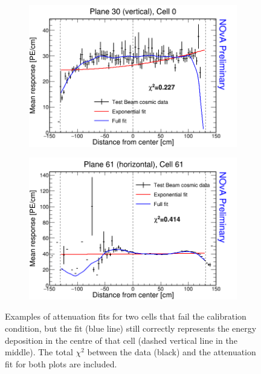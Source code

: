 \begin{figure}[h]
\centering
\begin{subfigure}[b]{0.495\textwidth}
\centering
\includegraphics[width=\textwidth]{Plots/TBCalibration/ExampleForBrightFile_fb0_030_000.png}
\end{subfigure}
\begin{subfigure}[b]{0.495\textwidth}
\centering
\includegraphics[width=\textwidth]{Plots/TBCalibration/ExampleForBrightFile_fb5_061_061.png}
\end{subfigure}
\caption[Example of failed attenuation fits used for the Test Beam fibre brightness file]{Examples of attenuation fits for two cells that fail the calibration condition, but the fit (blue line) still correctly represents the energy deposition in the centre of that cell (dashed vertical line in the middle). The total $\chi^2$ between the data (black) and the attenuation fit for both plots are included.}
\label{fig:FiberBrightnessExamples}
\end{figure}

